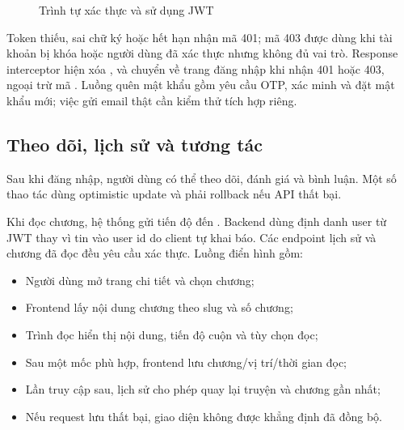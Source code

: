 \begin{figure}[H]
\caption{Trình tự xác thực và sử dụng JWT}
\label{fig:auth-sequence}
\end{figure}

Token thiếu, sai chữ ký hoặc hết hạn nhận mã 401; mã 403 được dùng khi tài khoản bị khóa hoặc người dùng đã xác thực nhưng không đủ vai trò. Response interceptor hiện xóa ,  và chuyển về trang đăng nhập khi nhận 401 hoặc 403, ngoại trừ mã . Luồng quên mật khẩu gồm yêu cầu OTP, xác minh và đặt mật khẩu mới; việc gửi email thật cần kiểm thử tích hợp riêng.
\clearpage
\subsection{Theo dõi, lịch sử và tương tác}

Sau khi đăng nhập, người dùng có thể theo dõi, đánh giá và bình luận. Một số thao tác dùng optimistic update và phải rollback nếu API thất bại.

Khi đọc chương, hệ thống gửi tiến độ đến . Backend dùng định danh user từ JWT thay vì tin vào user id do client tự khai báo. Các endpoint lịch sử và chương đã đọc đều yêu cầu xác thực. Luồng điển hình gồm:

\begin{itemize}[leftmargin=4.5em, label=--, labelsep=0.6em]
  \item Người dùng mở trang chi tiết và chọn chương;
  \item Frontend lấy nội dung chương theo slug và số chương;
  \item Trình đọc hiển thị nội dung, tiến độ cuộn và tùy chọn đọc;
  \item Sau một mốc phù hợp, frontend lưu chương/vị trí/thời gian đọc;
  \item Lần truy cập sau, lịch sử cho phép quay lại truyện và chương gần nhất;
  \item Nếu request lưu thất bại, giao diện không được khẳng định đã đồng bộ.
\end{itemize}
